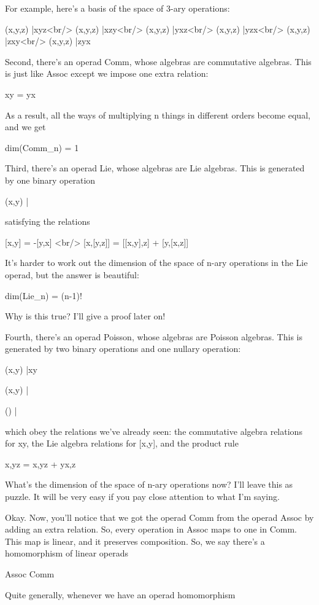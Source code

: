 For example, here's a basis of the space of 3-ary operations:

(x,y,z) |\to  xyz<br/>
(x,y,z) |\to  xzy<br/>
(x,y,z) |\to  yxz<br/>
(x,y,z) |\to  yzx<br/>
(x,y,z) |\to  zxy<br/>
(x,y,z) |\to  zyx

Second, there's an operad Comm, whose algebras are commutative
algebras.  This is just like Assoc except we impose one extra
relation:

xy = yx

As a result, all the ways of multiplying n things in different orders
become equal, and we get

dim(Comm_{n}) = 1

Third, there's an operad Lie, whose algebras are Lie algebras.
This is generated by one binary operation

(x,y) |\to  [x,y]

satisfying the relations

[x,y] = -[y,x] <br/>
[x,[y,z]] = [[x,y],z] + [y,[x,z]]

It's harder to work out the dimension of the space of n-ary operations
in the Lie operad, but the answer is beautiful:

dim(Lie_{n}) = (n-1)!

Why is this true?  I'll give a proof later on! 

Fourth, there's an operad Poisson, whose algebras are Poisson
algebras.  This is generated by two binary operations and one nullary
operation:

(x,y) |\to  xy

(x,y) |

() |

which obey the relations we've already seen: the commutative algebra
relations for xy, the Lie algebra relations for [x,y], and the product
rule

{x,yz} = {x,y}z + y{x,z}

What's the dimension of the space of n-ary operations now?  I'll leave
this as puzzle.  It will be very easy if you pay close attention to
what I'm saying.

Okay.  Now, you'll notice that we got the operad Comm from the operad
Assoc by adding an extra relation.  So, every operation in Assoc maps
to one in Comm.  This map is linear, and it preserves composition.
So, we say there's a homomorphism of linear operads

Assoc \to  Comm

Quite generally, whenever we have an operad homomorphism 

